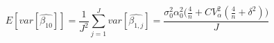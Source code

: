 \begin{equation}
E[var[\hat{\beta_{10}}]] = \frac{1}{J^2}\sum\limits_{j=1}^{J}{var[\hat{\beta_{1,j}}]} = \frac{\sigma_0^2\alpha_0^2\Big(\frac{4}{n} + CV_{\alpha}^2(\frac{4}{n} + \delta^2)\Big)}{J}
\end{equation}